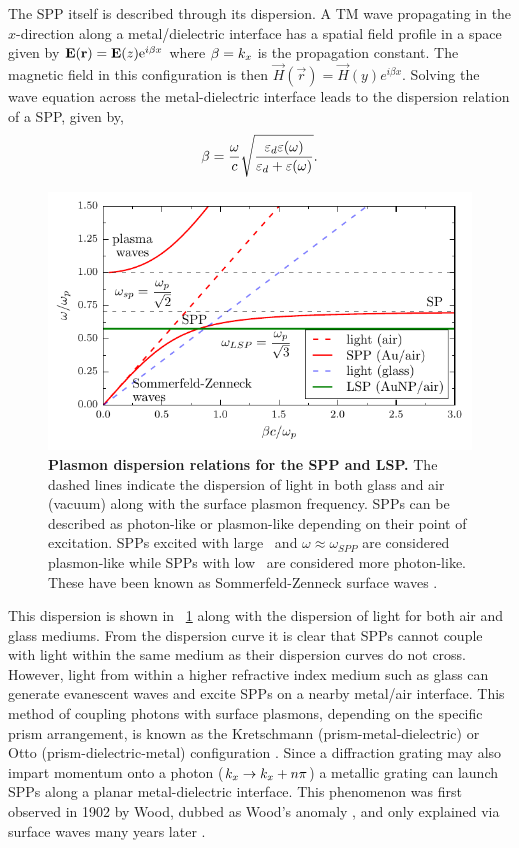 \documentclass{article}
\begin{document}
The SPP itself is described through its dispersion. A TM wave propagating in the $x$-direction along a metal/dielectric interface has a spatial field profile in a space  given by $\mathbf{E}(\mathbf{r}) = \mathbf{E}(z)\mathrm{e}^{i\beta x}$ where $\beta=k_x$ is the propagation constant. The magnetic field in this configuration is then $\vec{H}(\vec{r}) = \vec{H}(y)e^{i\beta x}$. Solving the wave equation across the metal-dielectric interface leads to the dispersion relation of a SPP, given by,
\begin{equation}
	\beta = \frac{\omega}{c}\sqrt{\frac{\varepsilon_d\varepsilon(\omega)}{\varepsilon_d + \varepsilon(\omega)}}.
	\label{eq:spp_dispersion}
\end{equation}
\begin{figure}[bt]
\centering
\includegraphics{figures/spp_dispersion}
\caption[Plasmon dispersion relations for the SPP and LSP]{\textbf{Plasmon dispersion relations for the SPP and LSP.} The dashed lines indicate the dispersion of light in both glass and air (vacuum) along with the surface plasmon frequency. SPPs can be described as photon-like or plasmon-like depending on their point of excitation. SPPs excited with large \wvm\ and $\omega\approx\omega_{SPP}$ are considered plasmon-like while SPPs with low \wvm\ are considered more photon-like. These have been known as Sommerfeld-Zenneck surface waves \cite{kittel1976introduction}.}
\label{fig:spp_dispersion}
\end{figure}
This dispersion is shown in \figurename~\ref{fig:spp_dispersion} along with the dispersion of light for both air and glass mediums.
From the dispersion curve it is clear that SPPs cannot couple with light within the same medium as their dispersion curves do not cross. However, light from within a higher refractive index medium such as glass can generate evanescent waves and excite SPPs on a nearby metal/air interface. This method of coupling photons with surface plasmons, depending on the specific prism arrangement, is known as the Kretschmann (prism-metal-dielectric) or Otto (prism-dielectric-metal) configuration \cite{otto1968, kretschmann1971}. Since a diffraction grating may also impart momentum onto a photon ($k_x \rightarrow k_x + n\pi$) a metallic grating can launch SPPs along a planar metal-dielectric interface. This phenomenon was first observed in 1902 by Wood, dubbed as Wood's anomaly \cite{wood1902}, and only explained via surface waves many years later \cite{fano1941}.
\end{document}
